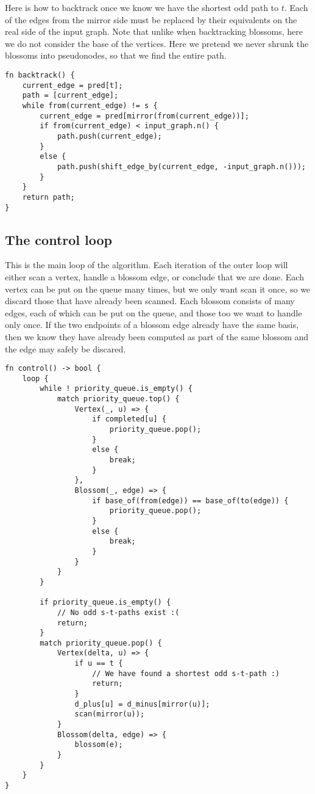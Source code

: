 Here is how to backtrack once we know we have the shortest odd path to $t$. Each of the edges from the mirror side must be replaced by their equivalents on the real side of the input graph. Note that unlike when backtracking blossoms, here we do not consider the base of the vertices. Here we pretend we never shrunk the blossoms into pseudonodes, so that we find the entire path.
\begin{lstlisting}[caption={Backtracking},label=Listing,mathescape=true]
fn backtrack() {
    current_edge = pred[t];
    path = [current_edge];
    while from(current_edge) != s {
        current_edge = pred[mirror(from(current_edge))];
        if from(current_edge) < input_graph.n() {
            path.push(current_edge);
        }
        else {
            path.push(shift_edge_by(current_edge, -input_graph.n()));
        }
    }
    return path;
}
\end{lstlisting}

\subsection{The control loop}
This is the main loop of the algorithm. Each iteration of the outer loop will either scan a vertex, handle a blossom edge, or conclude that we are done. Each vertex can be put on the queue many times, but we only want scan it once, so we discard those that have already been scanned. Each blossom consists of many edges, each of which can be put on the queue, and those too we want to handle only once. If the two endpoints of a blossom edge already have the same basis, then we know they have already been computed as part of the same blossom and the edge may safely be discared.
\begin{lstlisting}[caption={Control, the main loop},label=Listing,mathescape=true]
fn control() -> bool {
    loop {
        while ! priority_queue.is_empty() {
            match priority_queue.top() {
                Vertex(_, u) => {
                    if completed[u] {
                        priority_queue.pop();
                    }
                    else {
                        break;
                    }
                },
                Blossom(_, edge) => {
                    if base_of(from(edge)) == base_of(to(edge)) {
                        priority_queue.pop();
                    }
                    else {
                        break;
                    }
                }
            }
        }

        if priority_queue.is_empty() {
            // No odd s-t-paths exist :(
            return;
        }
        match priority_queue.pop() {
            Vertex(delta, u) => {
                if u == t {
                    // We have found a shortest odd s-t-path :)
                    return;
                }
                d_plus[u] = d_minus[mirror(u)];
                scan(mirror(u));
            }
            Blossom(delta, edge) => {
                blossom(e);
            }
        }
    }
}
\end{lstlisting}

